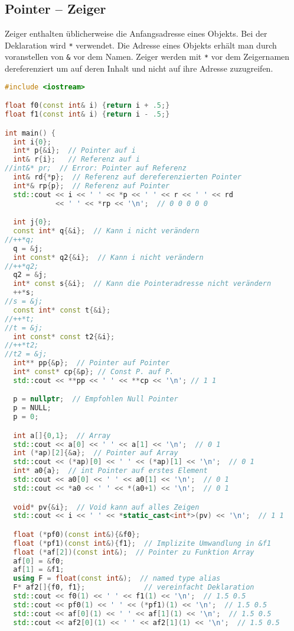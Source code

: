 \documentclass[10pt,twocolumn]{scrartcl}
\begin{document}
\subsection{Pointer -- Zeiger}

Zeiger enthalten üblicherweise die Anfangsadresse eines Objekts. Bei der
Deklaration wird \lstinline|*| verwendet. Die Adresse eines Objekts erhält man
durch voranstellen von \lstinline|&| vor dem Namen. Zeiger werden mit
\lstinline|*| vor dem Zeigernamen dereferenziert um auf deren Inhalt und nicht
auf ihre Adresse zuzugreifen.

\begin{lstlisting}[language=C++]
#include <iostream>

float f0(const int& i) {return i + .5;}
float f1(const int& i) {return i - .5;}

int main() {
  int i{0};
  int* p{&i};  // Pointer auf i
  int& r{i};   // Referenz auf i
//int&* pr;  // Error: Pointer auf Referenz
  int& rd{*p};  // Referenz auf dereferenzierten Pointer
  int*& rp{p};  // Referenz auf Pointer
  std::cout << i << ' ' << *p << ' ' << r << ' ' << rd
            << ' ' << *rp << '\n';  // 0 0 0 0 0

  int j{0};
  const int* q{&i};  // Kann i nicht verändern
//++*q;
  q = &j;
  int const* q2{&i};  // Kann i nicht verändern
//++*q2;
  q2 = &j;
  int* const s{&i};  // Kann die Pointeradresse nicht verändern
  ++*s;
//s = &j;
  const int* const t{&i};
//++*t;
//t = &j;
  int const* const t2{&i};
//++*t2;
//t2 = &j;
  int** pp{&p};  // Pointer auf Pointer
  int* const* cp{&p}; // Const P. auf P.
  std::cout << **pp << ' ' << **cp << '\n'; // 1 1

  p = nullptr;  // Empfohlen Null Pointer
  p = NULL;
  p = 0;

  int a[]{0,1};  // Array
  std::cout << a[0] << ' ' << a[1] << '\n';  // 0 1
  int (*ap)[2]{&a};  // Pointer auf Array
  std::cout << (*ap)[0] << ' ' << (*ap)[1] << '\n';  // 0 1
  int* a0{a};  // int Pointer auf erstes Element
  std::cout << a0[0] << ' ' << a0[1] << '\n';  // 0 1
  std::cout << *a0 << ' ' << *(a0+1) << '\n';  // 0 1

  void* pv{&i};  // Void kann auf alles Zeigen
  std::cout << i << ' ' << *static_cast<int*>(pv) << '\n';  // 1 1

  float (*pf0)(const int&){&f0};
  float (*pf1)(const int&){f1};  // Implizite Umwandlung in &f1
  float (*af[2])(const int&);  // Pointer zu Funktion Array
  af[0] = &f0;
  af[1] = &f1;
  using F = float(const int&);  // named type alias
  F* af2[]{f0, f1};              // vereinfacht Deklaration
  std::cout << f0(1) << ' ' << f1(1) << '\n';  // 1.5 0.5
  std::cout << pf0(1) << ' ' << (*pf1)(1) << '\n';  // 1.5 0.5
  std::cout << af[0](1) << ' ' << af[1](1) << '\n';  // 1.5 0.5
  std::cout << af2[0](1) << ' ' << af2[1](1) << '\n';  // 1.5 0.5


\end{lstlisting}
\end{document}
